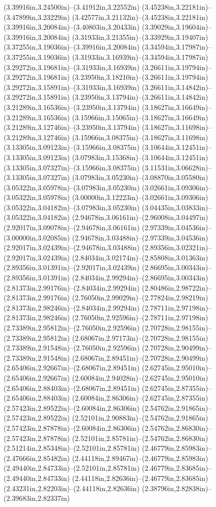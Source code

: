 (3.39916in,3.24500in)--(3.41912in,3.22552in) (3.45238in,3.22181in)--(3.47899in,3.23229in) (3.42577in,3.21132in)--(3.45238in,3.22181in) (3.39916in,3.20084in)--(3.40803in,3.20433in) (3.39029in,3.19604in)--(3.39916in,3.20084in) (3.31933in,3.21355in)--(3.33929in,3.19407in) (3.37255in,3.19036in)--(3.39916in,3.20084in) (3.34594in,3.17987in)--(3.37255in,3.19036in) (3.31933in,3.16939in)--(3.34594in,3.17987in) (3.29272in,3.19681in)--(3.31933in,3.16939in) (3.26611in,3.19794in)--(3.29272in,3.19681in) (3.23950in,3.18210in)--(3.26611in,3.19794in) (3.29272in,3.15891in)--(3.31933in,3.16939in) (3.26611in,3.14842in)--(3.29272in,3.15891in) (3.23950in,3.13794in)--(3.26611in,3.14842in) (3.21289in,3.16536in)--(3.23950in,3.13794in) (3.18627in,3.16649in)--(3.21289in,3.16536in) (3.15966in,3.15065in)--(3.18627in,3.16649in) (3.21289in,3.12746in)--(3.23950in,3.13794in) (3.18627in,3.11698in)--(3.21289in,3.12746in) (3.15966in,3.08375in)--(3.18627in,3.11698in) (3.13305in,3.09123in)--(3.15966in,3.08375in) (3.10644in,3.12451in)--(3.13305in,3.09123in) (3.07983in,3.15368in)--(3.10644in,3.12451in) (3.13305in,3.07327in)--(3.15966in,3.08375in) (3.11531in,3.06628in)--(3.13305in,3.07327in) (3.07983in,3.05230in)--(3.08870in,3.05580in) (3.05322in,3.05978in)--(3.07983in,3.05230in) (3.02661in,3.09306in)--(3.05322in,3.05978in) (3.00000in,3.12223in)--(3.02661in,3.09306in) (3.05322in,3.04182in)--(3.07983in,3.05230in) (3.04435in,3.03833in)--(3.05322in,3.04182in) (2.94678in,3.06161in)--(2.96008in,3.04497in) (2.92017in,3.09078in)--(2.94678in,3.06161in) (2.97339in,3.04536in)--(3.00000in,3.02085in) (2.94678in,3.03488in)--(2.97339in,3.04536in) (2.92017in,3.02439in)--(2.94678in,3.03488in) (2.89356in,3.02321in)--(2.92017in,3.02439in) (2.84034in,3.02174in)--(2.85808in,3.01363in) (2.89356in,3.01391in)--(2.92017in,3.02439in) (2.86695in,3.00343in)--(2.89356in,3.01391in) (2.84034in,2.99294in)--(2.86695in,3.00343in) (2.81373in,2.99176in)--(2.84034in,2.99294in) (2.80486in,2.98722in)--(2.81373in,2.99176in) (2.76050in,2.99029in)--(2.77824in,2.98219in) (2.81373in,2.98246in)--(2.84034in,2.99294in) (2.78711in,2.97198in)--(2.81373in,2.98246in) (2.76050in,2.92596in)--(2.78711in,2.97198in) (2.73389in,2.95812in)--(2.76050in,2.92596in) (2.70728in,2.98155in)--(2.73389in,2.95812in) (2.68067in,2.97173in)--(2.70728in,2.98155in) (2.73389in,2.91548in)--(2.76050in,2.92596in) (2.70728in,2.90499in)--(2.73389in,2.91548in) (2.68067in,2.89451in)--(2.70728in,2.90499in) (2.65406in,2.92667in)--(2.68067in,2.89451in) (2.62745in,2.95010in)--(2.65406in,2.92667in) (2.60084in,2.94028in)--(2.62745in,2.95010in) (2.65406in,2.88403in)--(2.68067in,2.89451in) (2.62745in,2.87355in)--(2.65406in,2.88403in) (2.60084in,2.86306in)--(2.62745in,2.87355in) (2.57423in,2.89522in)--(2.60084in,2.86306in) (2.54762in,2.91865in)--(2.57423in,2.89522in) (2.52101in,2.90883in)--(2.54762in,2.91865in) (2.57423in,2.87878in)--(2.60084in,2.86306in) (2.54762in,2.86830in)--(2.57423in,2.87878in) (2.52101in,2.85781in)--(2.54762in,2.86830in) (2.51214in,2.85348in)--(2.52101in,2.85781in) (2.46779in,2.85983in)--(2.47666in,2.85482in) (2.44118in,2.89467in)--(2.46779in,2.85983in) (2.49440in,2.84733in)--(2.52101in,2.85781in) (2.46779in,2.83685in)--(2.49440in,2.84733in) (2.44118in,2.82636in)--(2.46779in,2.83685in) (2.43231in,2.82203in)--(2.44118in,2.82636in) (2.38796in,2.82838in)--(2.39683in,2.82337in) 
